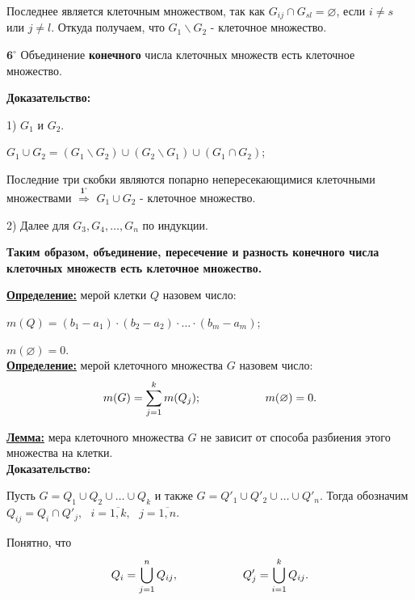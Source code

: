 \documentclass[a4paper,12pt]{article} %
\begin{document}
Последнее является клеточным множеством, так как $G_{ij} \cap G_{sl} = \varnothing$, если $i \neq s$ или $j \neq l$. Откуда получаем, что $G_1 \backslash G_2$ - клеточное множество.

\vspace{5mm}

$\textbf{6}^\circ$ Объединение \textbf{конечного} числа клеточных множеств есть клеточное множество.

\textbf{Доказательство:}

1) $G_1$ и $G_2$.

$G_1 \cup G_2 = \left(G_1 \backslash G_2\right) \cup \left(G_2 \backslash G_1\right) \cup \left(G_1 \cap G_2\right)$;

Последние три скобки являются попарно непересекающимися клеточными множествами $\stackrel{\textbf{1}^\circ}{\Rightarrow}$ $G_1 \cup G_2$ - клеточное множество.

2) Далее для $G_3, G_4, \ldots, G_n$ по индукции.

\vspace{7mm}

\textbf{Таким образом, объединение, пересечение и разность конечного числа клеточных множеств есть клеточное множество.}

\vspace{7mm}

\underline{\textbf{Определение:}} мерой клетки $Q$ назовем число:

$m(Q) = (b_1 - a_1)\cdot (b_2 - a_2)\cdot\ldots\cdot (b_m - a_m)$;

$m(\varnothing) = 0$.\\

\underline{\textbf{Определение:}} мерой клеточного множества $G$ назовем число:
\begin{equation*}
	m(G) = \sum\limits_{j = 1}^{k} m(Q_j); \hspace{20mm} m(\varnothing) = 0.
\end{equation*}

\underline{\textbf{Лемма:}} мера клеточного множества $G$ не зависит от способа разбиения этого множества на клетки.\\

\textbf{Доказательство:}

Пусть $G = Q_1 \cup Q_2 \cup \ldots \cup Q_k$ и также $G = Q'_1 \cup Q'_2 \cup \ldots \cup Q'_n$. Тогда обозначим $Q_{ij} = Q_i \cap Q'_j, \text{ } i = \overline{1, k}, \text{ } j = \overline{1, n}.$

Понятно, что 
\begin{equation*}
	Q_i = \bigcup_{j = 1}^n Q_{ij}, \hspace{20mm} Q'_j = \bigcup_{i = 1}^k Q_{ij}.
\end{equation*}
\end{document}
